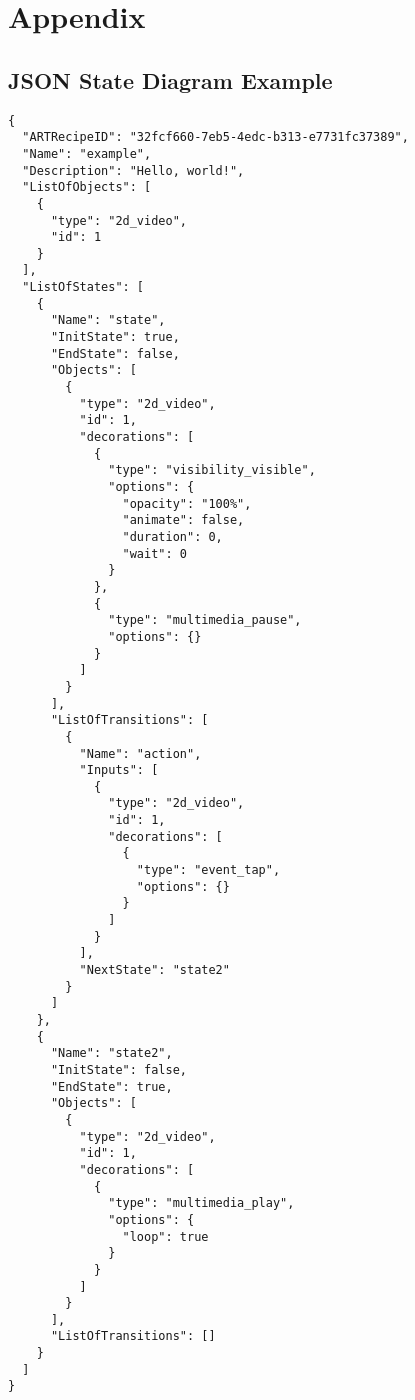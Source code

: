 \chapter{Appendix}
\label{appendix}

\section{JSON State Diagram Example}
\begin{lstlisting}[caption={JSON State Diagram Example}, label=json-schema-example,basicstyle=\ttfamily\footnotesize]
{
  "ARTRecipeID": "32fcf660-7eb5-4edc-b313-e7731fc37389",
  "Name": "example",
  "Description": "Hello, world!",
  "ListOfObjects": [
    {
      "type": "2d_video",
      "id": 1
    }
  ],
  "ListOfStates": [
    {
      "Name": "state",
      "InitState": true,
      "EndState": false,
      "Objects": [
        {
          "type": "2d_video",
          "id": 1,
          "decorations": [
            {
              "type": "visibility_visible",
              "options": {
                "opacity": "100%",
                "animate": false,
                "duration": 0,
                "wait": 0
              }
            },
            {
              "type": "multimedia_pause",
              "options": {}
            }
          ]
        }
      ],
      "ListOfTransitions": [
        {
          "Name": "action",
          "Inputs": [
            {
              "type": "2d_video",
              "id": 1,
              "decorations": [
                {
                  "type": "event_tap",
                  "options": {}
                }
              ]
            }
          ],
          "NextState": "state2"
        }
      ]
    },
    {
      "Name": "state2",
      "InitState": false,
      "EndState": true,
      "Objects": [
        {
          "type": "2d_video",
          "id": 1,
          "decorations": [
            {
              "type": "multimedia_play",
              "options": {
                "loop": true
              }
            }
          ]
        }
      ],
      "ListOfTransitions": []
    }
  ]
}
\end{lstlisting}


